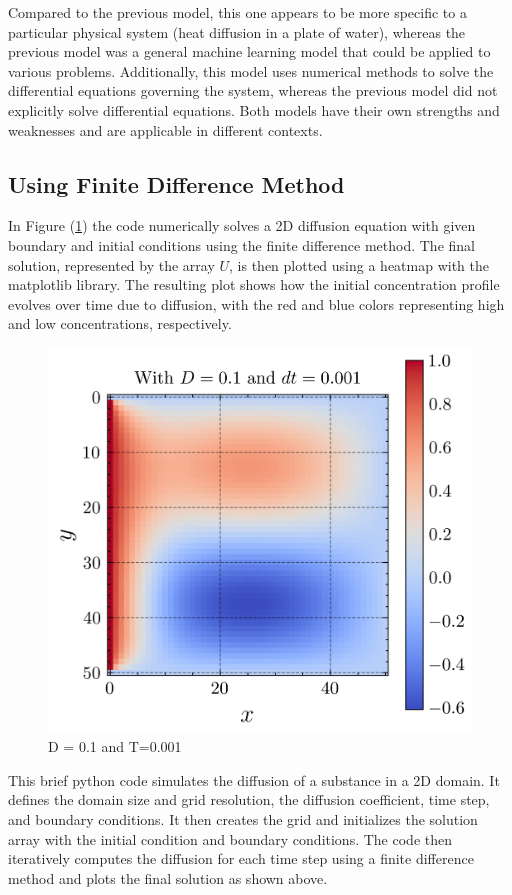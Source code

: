 Compared to the previous model, this one appears to be more specific to a particular physical system (heat diffusion in a plate of water), whereas the previous model was a general machine learning model that could be applied to various problems. Additionally, this model uses numerical methods to solve the differential equations governing the system, whereas the previous model did not explicitly solve differential equations. Both models have their own strengths and weaknesses and are applicable in different contexts.

\subsection{Using Finite Difference Method}
In Figure (\ref{fig:fdmm}) the code numerically solves a 2D diffusion equation with given boundary and initial conditions using the finite difference method. The final solution, represented by the array $U$, is then plotted using a heatmap with the matplotlib library. The resulting plot shows how the initial concentration profile evolves over time due to diffusion, with the red and blue colors representing high and low concentrations, respectively. 

\begin{figure}[htb!]
\begin{center}
\includegraphics[width=.49\textwidth]{images/0.1_time.png}
\vspace*{-8mm}
\caption{D = 0.1 and T=0.001}
\label{fig:fdmm}
\end{center}
\end{figure}

This brief python code simulates the diffusion of a substance in a 2D domain. It defines the domain size and grid resolution, the diffusion coefficient, time step, and boundary conditions. It then creates the grid and initializes the solution array with the initial condition and boundary conditions. The code then iteratively computes the diffusion for each time step using a finite difference method and plots the final solution as shown above.

